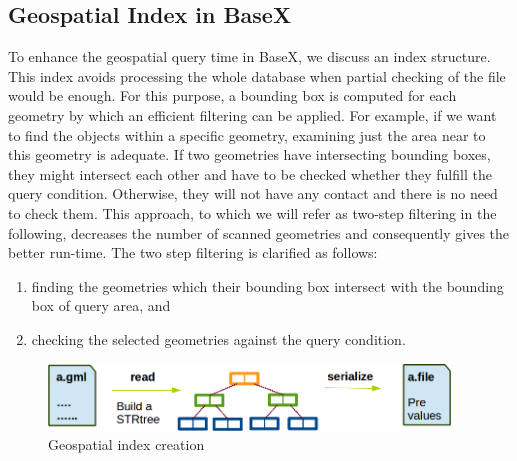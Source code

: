 \documentclass[a4paper,12pt]{article}
\begin{document}
\subsection{Geospatial Index in BaseX}
\label{indexBX}
To enhance the geospatial query time in BaseX, we discuss an index structure. This index avoids processing the whole database when partial checking of the file would be enough. For this purpose, a bounding box is computed for each geometry by which an efficient filtering can be applied. For example, if we want to find the objects within a specific geometry, examining just the area near to this geometry is adequate. If two geometries have intersecting bounding boxes, they might intersect each other and have to be checked whether they fulfill the query condition. Otherwise, they will not have any contact and there is no need to check them. This approach, to which we will refer as two-step filtering in the following, decreases the number of scanned geometries and consequently gives the better run-time. The two step filtering is clarified as follows:
\begin{enumerate}
\item finding the geometries which their bounding box intersect with the bounding box of query area, and
\item checking the selected geometries against the query condition.
\end{enumerate}


 \begin{figure}
\centering
\includegraphics[width=0.95\textwidth]{IndexinFile}
\caption{Geospatial index creation}
\label{figIndexinFile}
\end{figure}
\end{document}
